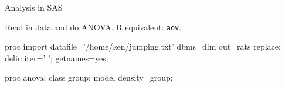 \documentclass[unknownkeysallowed]{beamer}\usepackage[]{graphicx}\usepackage[]{color}
\begin{document}

\begin{frame}[fragile]{Analysis in SAS}

Read in data and do ANOVA. R equivalent: \texttt{aov}.

\begin{Datastep}
proc import
  datafile='/home/ken/jumping.txt'
    dbms=dlm
    out=rats
    replace;
  delimiter=' ';
  getnames=yes;
\end{Datastep}


\begin{Sascode}[store=ih]
proc anova;
  class group;
  model density=group;
\end{Sascode}

  
\end{frame}
\end{document}
